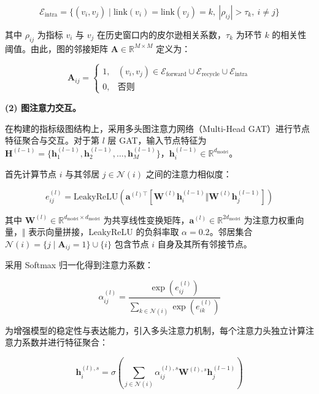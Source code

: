 \begin{equation}
\mathcal{E}_{\text{intra}} = \{(v_i, v_j) \mid \text{link}(v_i)=\text{link}(v_j)=k,\ |\rho_{ij}| > \tau_k,\ i\neq j\}
\end{equation}

其中 $\rho_{ij}$ 为指标 $v_i$ 与 $v_j$ 在历史窗口内的皮尔逊相关系数，$\tau_k$ 为环节 $k$ 的相关性阈值。由此，图的邻接矩阵 $\mathbf{A}\in\mathbb{R}^{M\times M}$ 定义为：

\begin{equation}
\mathbf{A}_{ij} = \begin{cases}
1, & (v_i, v_j) \in \mathcal{E}_{\text{forward}} \cup \mathcal{E}_{\text{recycle}} \cup \mathcal{E}_{\text{intra}} \\
0, & \text{否则}
\end{cases}
\end{equation}

\textbf{(2) 图注意力交互。}

在构建的指标级图结构上，采用多头图注意力网络（Multi-Head GAT）进行节点特征聚合与交互。对于第 $l$ 层 GAT，输入节点特征为 $\mathbf{H}^{(l-1)}=\{\mathbf{h}_1^{(l-1)},\mathbf{h}_2^{(l-1)},\ldots,\mathbf{h}_M^{(l-1)}\}$，$\mathbf{h}_i^{(l-1)}\in\mathbb{R}^{d_{\text{model}}}$。

首先计算节点 $i$ 与其邻居 $j\in\mathcal{N}(i)$ 之间的注意力相似度：

\begin{equation}
e_{ij}^{(l)} = \text{LeakyReLU}\left(\mathbf{a}^{(l)\top}\left[\mathbf{W}^{(l)}\mathbf{h}_i^{(l-1)} \Vert \mathbf{W}^{(l)}\mathbf{h}_j^{(l-1)}\right]\right)
\end{equation}

其中 $\mathbf{W}^{(l)}\in\mathbb{R}^{d_{\text{model}}\times d_{\text{model}}}$ 为共享线性变换矩阵，$\mathbf{a}^{(l)}\in\mathbb{R}^{2d_{\text{model}}}$ 为注意力权重向量，$\Vert$ 表示向量拼接，LeakyReLU 的负斜率取 $\alpha=0.2$。邻居集合 $\mathcal{N}(i)=\{j\mid\mathbf{A}_{ij}=1\}\cup\{i\}$ 包含节点 $i$ 自身及其所有邻接节点。

采用 Softmax 归一化得到注意力系数：

\begin{equation}
\alpha_{ij}^{(l)} = \frac{\exp(e_{ij}^{(l)})}{\sum_{k\in\mathcal{N}(i)}\exp(e_{ik}^{(l)})}
\end{equation}

为增强模型的稳定性与表达能力，引入多头注意力机制，每个注意力头独立计算注意力系数并进行特征聚合：

\begin{equation}
\mathbf{h}_i^{(l),s} = \sigma\left(\sum_{j\in\mathcal{N}(i)} \alpha_{ij}^{(l),s} \mathbf{W}^{(l),s} \mathbf{h}_j^{(l-1)}\right)
\end{equation}

